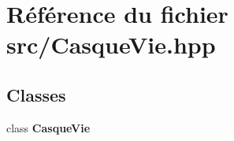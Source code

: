 \section{Référence du fichier src/\-Casque\-Vie.hpp}
\label{_casque_vie_8hpp}
\subsection*{Classes}
\begin{DoxyCompactItemize}
\item 
class {\bf Casque\-Vie}
\end{DoxyCompactItemize}
